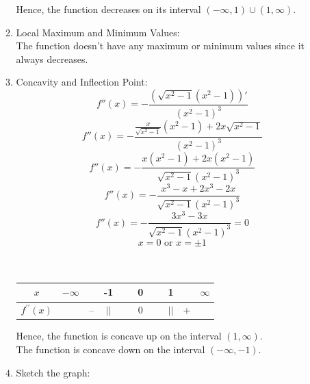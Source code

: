\documentclass[12pt]{article}
\begin{document}
\begin{enumerate}
\begin{enumerate}
                Hence, the function decreases on its interval $(-\infty,1)\cup (1, \infty)$.
            \item Local Maximum and Minimum Values:\\
                The function doesn't have any maximum or minimum values since it always decreases.
            \item Concavity and Inflection Point:
                \[f''(x) = - \frac{(\sqrt{x^2-1}(x^2 - 1))'}{(x^2 - 1)^3}\]
                \[f''(x) = - \frac{\frac{x}{\sqrt{x^2-1}}(x^2 - 1) + 2x\sqrt{x^2-1}}{(x^2 - 1)^3}\]
                \[f''(x) = - \frac{x(x^2 - 1) + 2x(x^2-1)}{\sqrt{x^2-1}(x^2 - 1)^3}\]
                \[f''(x) = - \frac{x^3 - x + 2x^3 - 2x}{\sqrt{x^2-1}(x^2 - 1)^3}\]
                \[f''(x) = - \frac{3x^3 - 3x}{\sqrt{x^2-1}(x^2 - 1)^3} = 0\]
                \[x = 0 \text{ or } x = \pm 1\]\\~
                \begin{center}
                    \begin{tabular}{c c c c c c c c c c}
                        $x$ & $-\infty$ & ~ & -1 & ~ & 0 & ~ & 1 & ~ & $\infty$ \\ 
                        \hline 
                        $f^{\prime\prime} (x)$ & ~ & -- & $||$ & ~ & 0 & ~ & $||$ & + \\ 
                    \end{tabular}    
                \end{center}
                Hence, the function is concave up on the interval $(1, \infty)$.\\
                The function is concave down on the interval $(-\infty, -1)$.
            \newpage
            \item Sketch the graph:
            \begin{figure}[!h]
                \centering
                \begin{framed}
\end{framed}
\end{figure}
\end{enumerate}
\end{enumerate}
\end{document}
